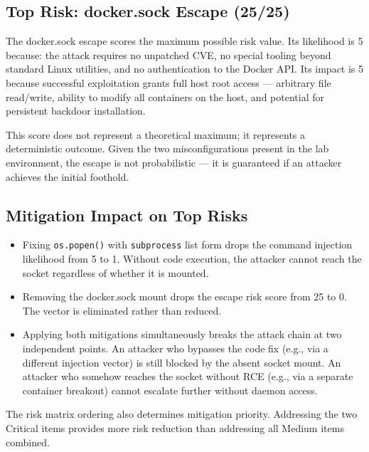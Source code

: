 \subsection{Top Risk: docker.sock Escape (25/25)}

The docker.sock escape scores the maximum possible risk value. Its likelihood is 5 because: the attack requires no unpatched CVE, no special tooling beyond standard Linux utilities, and no authentication to the Docker API. Its impact is 5 because successful exploitation grants full host root access --- arbitrary file read/write, ability to modify all containers on the host, and potential for persistent backdoor installation.

This score does not represent a theoretical maximum; it represents a deterministic outcome. Given the two misconfigurations present in the lab environment, the escape is not probabilistic --- it is guaranteed if an attacker achieves the initial foothold.

\subsection{Mitigation Impact on Top Risks}

\begin{itemize}
    \item Fixing \texttt{os.popen()} with \texttt{subprocess} list form drops the command injection likelihood from 5 to 1. Without code execution, the attacker cannot reach the socket regardless of whether it is mounted.
    \item Removing the docker.sock mount drops the escape risk score from 25 to 0. The vector is eliminated rather than reduced.
    \item Applying both mitigations simultaneously breaks the attack chain at two independent points. An attacker who bypasses the code fix (e.g., via a different injection vector) is still blocked by the absent socket mount. An attacker who somehow reaches the socket without RCE (e.g., via a separate container breakout) cannot escalate further without daemon access.
\end{itemize}

The risk matrix ordering also determines mitigation priority. Addressing the two Critical items provides more risk reduction than addressing all Medium items combined.